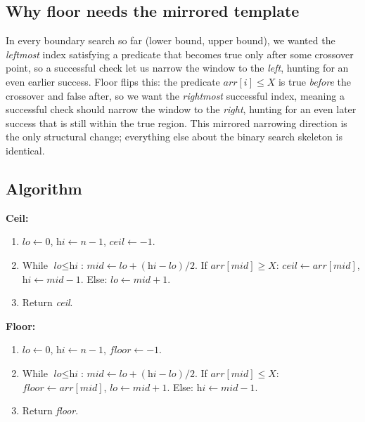 \subsection*{Why floor needs the mirrored template}

In every boundary search so far (lower bound, upper bound), we wanted the
\emph{leftmost} index satisfying a predicate that becomes true only after
some crossover point, so a successful check let us narrow the window to the
\emph{left}, hunting for an even earlier success. Floor flips this: the
predicate $\textit{arr}[i] \le X$ is true \emph{before} the crossover and
false after, so we want the \emph{rightmost} successful index, meaning a
successful check should narrow the window to the \emph{right}, hunting for
an even later success that is still within the true region. This mirrored
narrowing direction is the only structural change; everything else about
the binary search skeleton is identical.

\subsection*{Algorithm}

\textbf{Ceil:}
\begin{enumerate}
  \item $\textit{lo} \gets 0$, $\textit{hi} \gets n-1$,
        $\textit{ceil} \gets -1$.
  \item While $\textit{lo} \le \textit{hi}$: $\textit{mid} \gets
        \textit{lo}+(\textit{hi}-\textit{lo})/2$. If
        $\textit{arr}[\textit{mid}] \ge X$: $\textit{ceil} \gets
        \textit{arr}[\textit{mid}]$, $\textit{hi} \gets \textit{mid}-1$.
        Else: $\textit{lo} \gets \textit{mid}+1$.
  \item Return \textit{ceil}.
\end{enumerate}

\textbf{Floor:}
\begin{enumerate}
  \item $\textit{lo} \gets 0$, $\textit{hi} \gets n-1$,
        $\textit{floor} \gets -1$.
  \item While $\textit{lo} \le \textit{hi}$: $\textit{mid} \gets
        \textit{lo}+(\textit{hi}-\textit{lo})/2$. If
        $\textit{arr}[\textit{mid}] \le X$: $\textit{floor} \gets
        \textit{arr}[\textit{mid}]$, $\textit{lo} \gets \textit{mid}+1$.
        Else: $\textit{hi} \gets \textit{mid}-1$.
  \item Return \textit{floor}.
\end{enumerate}

